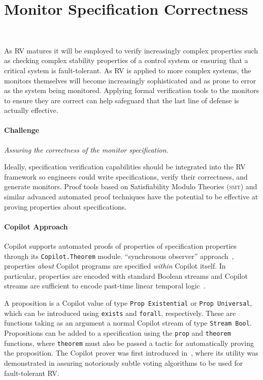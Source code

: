 \section{Monitor Specification Correctness}~\label{sec:verispec}

As RV matures it will be employed to
verify increasingly complex properties such as checking complex
stability properties of a control system or ensuring that a critical
system is fault-tolerant. As RV is applied to more complex systems, the
monitors themselves will become increasingly sophisticated and as prone to error
as the system being monitored.  Applying formal verification
tools to the monitors to ensure they are correct can help safeguard
that the last line of defense is actually effective. 

\paragraph{Challenge}  \emph{Assuring the correctness of the monitor
specification.}   

Ideally, specification verification capabilities should be integrated
into the RV framework so engineers could write specifications, verify
their correctness, and generate monitors.  Proof tools based on
Satisfiability Modulo Theories (\textsc{smt}) and similar advanced
automated proof techniques have the potential to be effective at
proving properties about specifications. 


\paragraph{Copilot Approach}  
 Copilot supports automated proofs of properties of specification
 properties  through its {\tt Copilot.Theorem} module.  
``synchronous observer'' approach~\cite{amast93}, properties \emph{about}
Copilot programs are specified \emph{within} Copilot itself. In particular,
properties are encoded with standard Boolean streams and Copilot streams are
sufficient to encode past-time linear temporal logic~\cite{ptltl}.

 A proposition is a Copilot value of type \texttt{Prop Existential}
 or \texttt{Prop Universal}, which can be introduced using \texttt{exists} and
\texttt{forall}, respectively. These are functions taking as an argument a
normal Copilot stream of type \lstinline{Stream Bool}. Propositions can be added
to a specification using the \texttt{prop} and \texttt{theorem} functions,
where \texttt{theorem} must also be passed a tactic for automatically proving
the proposition. The Copilot prover was first introduced
in~\cite{pike-rv-15}, where its utility was demonstrated in assuring
notoriously subtle voting algorithms to be used for fault-tolerant RV.

